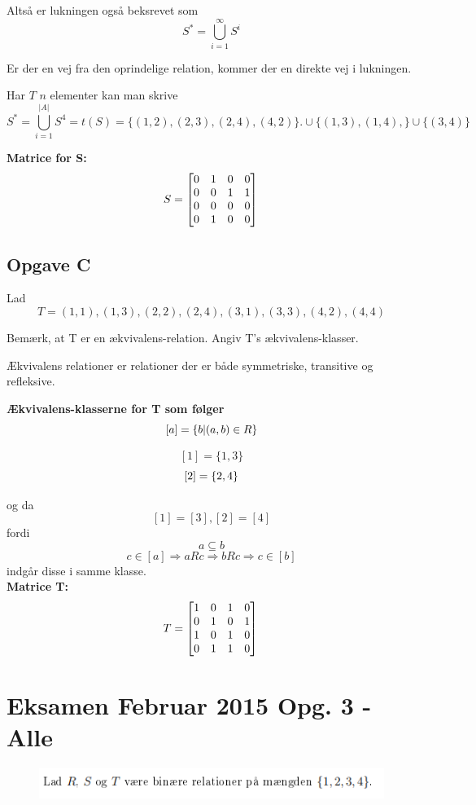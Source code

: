 \documentclass{article}
\begin{document}
Altså er lukningen også beksrevet som \[S^*=\bigcup_{i=1}^{\infty} S^i\]

Er der en vej fra den oprindelige relation, kommer der en direkte vej i lukningen.

Har $T$ $n$ elementer kan man skrive \[S^*=\bigcup_{i=1}^{|A|} S^4 = t(S)= \{(1, 2),(2, 3),(2, 4),(4, 2)\}. \cup \{(1,3), (1,4),\} \cup \{(3,4)\}\]



\textbf{Matrice for S:}\\

\[S=\begin{bmatrix}
0 & 1 & 0 & 0\\
0 & 0 & 1 & 1\\
0 & 0 & 0 & 0\\
0 & 1 & 0 & 0
\end{bmatrix}\\\]



\subsection{Opgave C}

Lad \[T = {(1, 1),(1, 3),(2, 2),(2, 4),(3, 1),(3, 3),(4, 2),(4, 4)}\]

Bemærk, at T er en ækvivalens-relation.
Angiv T's ækvivalens-klasser.

Ækvivalens relationer er relationer der er både symmetriske, transitive og refleksive. 

\textbf{Ækvivalens-klasserne for T som følger \[[a] = \{b \vert (a,b) \in R\}\\\]}

\[[1]=\{1,3\}\]
\[[2]=\{2,4\}\\\]

og da \[[1]=[3], [2]=[4]\] fordi \[a\subseteq b\] \[c \in [a] \Rightarrow aRc \Rightarrow bRc \Rightarrow c\in [b]\]
indgår disse i samme klasse.\\

\textbf{Matrice T:}\\

\[T=\begin{bmatrix}
1 & 0 & 1 & 0\\
0 & 1 & 0 & 1\\
1 & 0 & 1 & 0\\
0 & 1 & 1 & 0
\end{bmatrix}\\\]
\pagebreak
\section{Eksamen Februar 2015 Opg. 3 - Alle}
\begin{figure}[h]
\begin{center}
\includegraphics[scale=0.9]{2015Opgave3FormuleringOver}
\end{center}
\end{figure}
\end{document}
